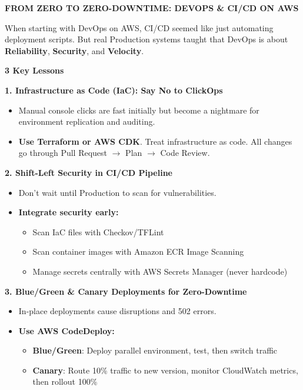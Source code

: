 \vspace{0.5em}\noindent\textbf{FROM ZERO TO ZERO-DOWNTIME: DEVOPS \& CI/CD ON
AWS}\par

When starting with DevOps on AWS, CI/CD seemed like just automating
deployment scripts. But real Production systems taught that DevOps is
about \textbf{Reliability}, \textbf{Security}, and \textbf{Velocity}.

\vspace{0.5em}\noindent\textbf{3 Key Lessons}\par

\vspace{0.5em}\noindent\textbf{1. Infrastructure as Code (IaC): Say No to
ClickOps}\par

\begin{itemize}
\tightlist
\item
  Manual console clicks are fast initially but become a nightmare for
  environment replication and auditing.
\item
  \textbf{Use Terraform or AWS CDK}. Treat infrastructure as code. All
  changes go through Pull Request \(\rightarrow\) Plan \(\rightarrow\)
  Code Review.
\end{itemize}

\vspace{0.5em}\noindent\textbf{2. Shift-Left Security in CI/CD
Pipeline}\par

\begin{itemize}
\tightlist
\item
  Don't wait until Production to scan for vulnerabilities.
\item
  \textbf{Integrate security early:}

  \begin{itemize}
  \tightlist
  \item
    Scan IaC files with Checkov/TFLint
  \item
    Scan container images with Amazon ECR Image Scanning
  \item
    Manage secrets centrally with AWS Secrets Manager (never hardcode)
  \end{itemize}
\end{itemize}

\vspace{0.5em}\noindent\textbf{3. Blue/Green \& Canary Deployments for
Zero-Downtime}\par

\begin{itemize}
\tightlist
\item
  In-place deployments cause disruptions and 502 errors.
\item
  \textbf{Use AWS CodeDeploy:}

  \begin{itemize}
  \tightlist
  \item
    \textbf{Blue/Green}: Deploy parallel environment, test, then switch
    traffic
  \item
    \textbf{Canary}: Route 10\% traffic to new version, monitor
    CloudWatch metrics, then rollout 100\%
  \end{itemize}
\end{itemize}


